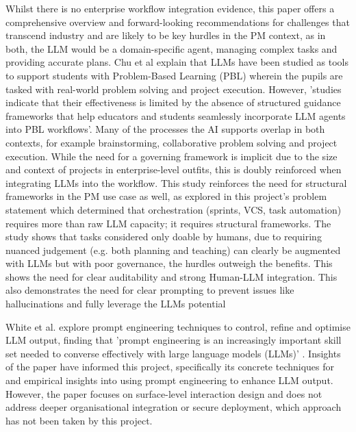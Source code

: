 \documentclass{report}
\begin{document}
Whilst there is no enterprise workflow integration evidence, this paper offers a comprehensive overview and forward-looking recommendations for challenges that transcend industry and are likely to be key hurdles in the PM context, as in both, the LLM would be a domain-specific agent, managing complex tasks and providing accurate plans. Chu et al explain that LLMs have been studied as tools to support students with Problem-Based Learning (PBL) wherein the pupils are tasked with real-world problem solving and project execution. However, 'studies indicate that their effectiveness is limited by the absence of structured guidance frameworks that help educators and students seamlessly incorporate LLM agents into PBL workflows'. Many of the processes the AI supports overlap in both contexts, for example brainstorming, collaborative problem solving and project execution. While the need for a governing framework is implicit due to the size and context of projects in enterprise-level outfits, this is doubly reinforced when integrating LLMs into the workflow. This study reinforces the need for structural frameworks in the PM use case as well, as explored in this project's problem statement which determined that orchestration (sprints, VCS, task automation) requires more than raw LLM capacity; it requires structural frameworks. The study shows that tasks considered only doable by humans, due to requiring nuanced judgement (e.g. both planning and teaching) can clearly be augmented with LLMs but with poor governance, the hurdles outweigh the benefits. This shows the need for clear auditability and strong Human-LLM integration. This also demonstrates the need for clear prompting to prevent issues like hallucinations and fully leverage the LLMs potential

White et al. explore prompt engineering techniques to control, refine and optimise LLM output, finding that 'prompt engineering is an increasingly important skill set needed to converse effectively with large language models (LLMs)' \parencite{whitePromptPatternCatalog2023}. Insights of the paper have informed this project, specifically its concrete techniques for and empirical insights into using prompt engineering to enhance LLM output. However, the paper focuses on surface-level interaction design and does not address deeper organisational integration or secure deployment, which approach has not been taken by this project. 
\end{document}
